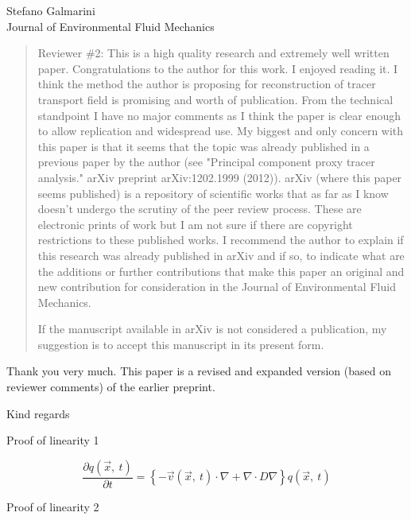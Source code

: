 \documentclass{letter}
\newcommand{\vect}[1]{\vec{#1}}
\begin{document}
\begin{letter}{Stefano Galmarini\\
Journal of Environmental Fluid Mechanics}
\begin{quote}
Reviewer \#2: This is a high quality research and extremely well written paper. Congratulations to the author for this work. I enjoyed reading it. I think the method the author is proposing for reconstruction of tracer transport field is promising and worth of publication. From the technical standpoint I have no major comments as I think the paper is clear enough to allow replication and widespread use. My biggest and only concern with this paper is that it seems that the topic was already published in a previous paper by the author (see "Principal component proxy tracer analysis." arXiv preprint arXiv:1202.1999 (2012)). arXiv (where this paper seems published)  is a repository of scientific works that as far as I know doesn't undergo the scrutiny of the peer review process. These are electronic prints of work but I am not sure if there are copyright restrictions to these published works. I recommend the author to explain if this research was already published in arXiv and if
so, to indicate what are the additions or further contributions that make this paper an original and new contribution for consideration in the Journal of Environmental Fluid Mechanics.

If the manuscript available in arXiv is not considered a publication, my suggestion is to accept this manuscript in its present form.
\end{quote}

Thank you very much. This paper is a revised and expanded version (based on reviewer comments) of the earlier preprint.

\closing{Kind regards}

{\Large Proof of linearity 1}

\begin{equation}
\frac{\partial q(\vect x, ~ t)}{\partial t} = \left \lbrace -\vect v(\vect x, ~t) \cdot \nabla + \nabla \cdot D \nabla \right \rbrace q(\vect x, ~ t)
\label{advection_diffusion}
\end{equation}



{\Large Proof of linearity 2}



\end{letter}
\end{document}
